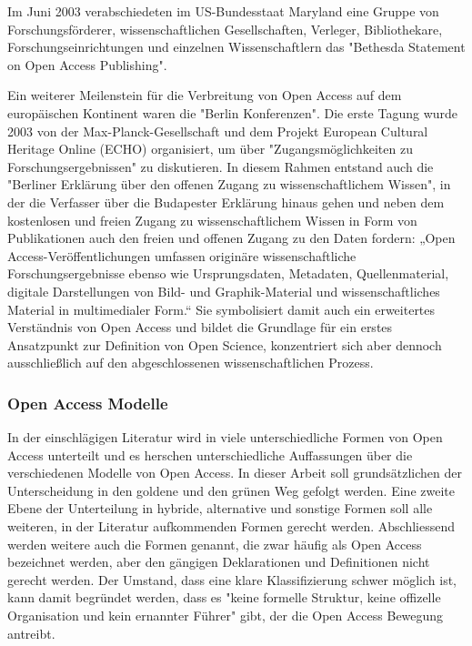 Im Juni 2003 verabschiedeten im US-Bundesstaat Maryland eine Gruppe von Forschungsförderer, wissenschaftlichen Gesellschaften, Verleger, Bibliothekare, Forschungseinrichtungen und einzelnen Wissenschaftlern das "Bethesda Statement on Open Access Publishing".\cite{suchen}

Ein weiterer Meilenstein für die Verbreitung von Open Access auf dem europäischen Kontinent waren die "Berlin Konferenzen"\cite{CREATe_2014}. Die erste Tagung wurde 2003 von der Max-Planck-Gesellschaft und dem Projekt European Cultural Heritage Online (ECHO) organisiert, um über "Zugangsmöglichkeiten zu Forschungsergebnissen" zu diskutieren. In diesem Rahmen entstand auch die "Berliner Erklärung über den offenen Zugang zu wissenschaftlichem Wissen"\cite{berliner_erklaerung_2003}, in der die Verfasser über die Budapester Erklärung hinaus gehen und neben dem kostenlosen und freien Zugang zu wissenschaftlichem Wissen in Form von Publikationen auch den freien und offenen Zugang zu den Daten fordern: „Open Access-Veröffentlichungen umfassen originäre wissenschaftliche Forschungsergebnisse ebenso wie Ursprungsdaten, Metadaten, Quellenmaterial, digitale Darstellungen von Bild- und Graphik-Material und wissenschaftliches Material in multimedialer Form.“\cite{berliner_erklaerung_2003} Sie symbolisiert damit auch ein erweitertes Verständnis von Open Access und bildet die Grundlage für ein erstes Ansatzpunkt zur Definition von Open Science, konzentriert sich aber dennoch ausschließlich auf den abgeschlossenen wissenschaftlichen Prozess\cite{suchen}.

\subsubsection{Open Access Modelle}

In der einschlägigen Literatur wird in viele unterschiedliche Formen von Open Access unterteilt\cite{CREATe_2014} und es herschen unterschiedliche Auffassungen über die verschiedenen Modelle von Open Access\cite{CREATe_2014}\cite{cite:22b}\cite{lewis_2012_inevitability}. In dieser Arbeit soll grundsätzlichen der Unterscheidung in den goldene und den grünen Weg gefolgt werden. Eine zweite Ebene der Unterteilung in hybride, alternative und sonstige Formen soll alle weiteren, in der Literatur aufkommenden Formen gerecht werden. Abschliessend werden weitere auch die Formen genannt, die zwar häufig als Open Access bezeichnet werden, aber den gängigen Deklarationen\cite{boai_2012} und Definitionen nicht gerecht werden. Der Umstand, dass eine klare Klassifizierung schwer möglich ist, kann damit begründet werden, dass es "keine formelle Struktur, keine offizelle Organisation und kein ernannter Führer" gibt, der die Open Access Bewegung antreibt\cite{poynder_2011_suber}.

